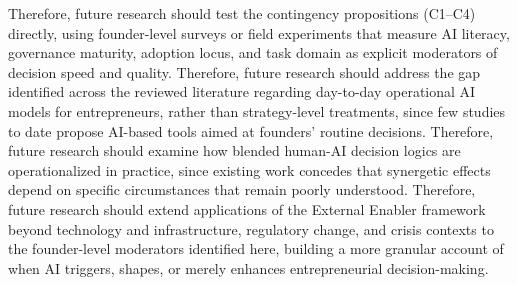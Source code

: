 \documentclass[11pt, a4paper]{article}
\begin{document}
Therefore, future research should test the contingency propositions (C1–C4) directly, using founder-level surveys or field experiments that measure AI literacy, governance maturity, adoption locus, and task domain as explicit moderators of decision speed and quality. Therefore, future research should address the gap identified across the reviewed literature regarding day-to-day operational AI models for entrepreneurs, rather than strategy-level treatments, since few studies to date propose AI-based tools aimed at founders' routine decisions. Therefore, future research should examine how blended human-AI decision logics are operationalized in practice, since existing work concedes that synergetic effects depend on specific circumstances that remain poorly understood. Therefore, future research should extend applications of the External Enabler framework beyond technology and infrastructure, regulatory change, and crisis contexts to the founder-level moderators identified here, building a more granular account of when AI triggers, shapes, or merely enhances entrepreneurial decision-making.



\end{document}
